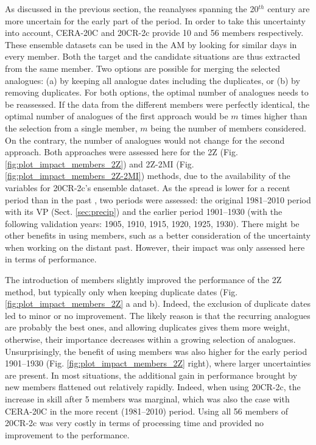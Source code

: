 \documentclass[smallextended]{svjour3}       %
\begin{document}
	As discussed in the previous section, the reanalyses spanning the 20$^{th}$ century are more uncertain for the early part of the period. In order to take this uncertainty into account, CERA-20C and 20CR-2c provide 10 and 56 members respectively. These ensemble datasets can be used in the AM by looking for similar days in every member. Both the target and the candidate situations are thus extracted from the same member. Two options are possible for merging the selected analogues: (a) by keeping all analogue dates including the duplicates, or (b) by removing duplicates. For both options, the optimal number of analogues needs to be reassessed. If the data from the different members were perfectly identical, the optimal number of analogues of the first approach would be $m$ times higher than the selection from a single member, $m$ being the number of members considered. On the contrary, the number of analogues would not change for the second approach. Both approaches were assessed here for the 2Z (Fig. \ref{fig:plot_impact_members_2Z}) and 2Z-2MI (Fig. \ref{fig:plot_impact_members_2Z-2MI}) methods, due to the availability of the variables for 20CR-2c's ensemble dataset. As the spread is lower for a recent period than in the past \citep{Compo2011}, two periods were assessed: the original 1981--2010 period with its VP (Sect. \ref{sec:precip}) and the earlier period 1901--1930 (with the following validation years: 1905, 1910, 1915, 1920, 1925, 1930). There might be other benefits in using members, such as a better consideration of the uncertainty when working on the distant past. However, their impact was only assessed here in terms of performance.
	
	The introduction of members slightly improved the performance of the 2Z method, but typically only when keeping duplicate dates (Fig. \ref{fig:plot_impact_members_2Z} a and b). Indeed, the exclusion of duplicate dates led to minor or no improvement. The likely reason is that the recurring analogues are probably the best ones, and allowing duplicates gives them more weight, otherwise, their importance decreases within a growing selection of analogues. Unsurprisingly, the benefit of using members was also higher for the early period 1901--1930 (Fig. \ref{fig:plot_impact_members_2Z} right), where larger uncertainties are present. In most situations, the additional gain in performance brought by new members flattened out relatively rapidly. Indeed, when using 20CR-2c, the increase in skill after 5 members was marginal, which was also the case with CERA-20C in the more recent (1981--2010) period. Using all 56 members of 20CR-2c was very costly in terms of processing time and provided no improvement to the performance. 
	
\end{document}
